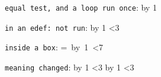 \documentclass{article}
\newcommand\sect[1]{\texttt{#1}: }
\begin{document}
\sect{equal test, and a loop run once}
\loop
  \advance\ca by 1
\ifnum{} \repeat
\the\ca\par

\sect{in an edef: not run}
\begingroup
  \def\m{\advance\ca by 1 \ifnum\ca<3\relax\expandafter\m\fi}%
  \m \the\ca
  \edef\n{\noexpand\relax}\n
\endgroup
\par

\sect{inside a box}
=\hbox{ \loop\advance\ca by 1 \ifnum\ca<7 \repeat\the\ca}\par

\sect{meaning changed}
\begingroup
  \let\plus\advance
  \loop
    \plus\ca by 1
  \ifnum\ca<3 \repeat
  \the\ca
  \def\q{\advance\ca by 1 \let\foo\relax \ifnum\ca<3\relax\expandafter\q\fi}\q
  \the\ca
\endgroup
\par
\end{document}
